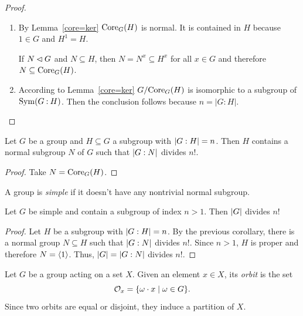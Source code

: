 \begin{proof}${}$

\begin{enumerate}[\upshape a)]
    \item By {\upshape Lemma~\ref{core=ker}} ${\rm Core}_G(H)$ is normal. It is contained in $H$ because $1\in G$ and $H^1=H$.
    
    If $N\lhd G$ and $N\subseteq H$, then $N=N^x\subseteq H^x$ for all $x\in G$ and therefore $N\subseteq{\rm Core}_G(H)$.

    \item According to {\upshape Lemma~\ref{core=ker}} $G/{\rm Core}_G(H)$ is isomorphic to a subgroup of\/ ${\rm Sym}(G\mathbin:H)$. Then the conclusion follows because $n=|G:H|$.
\end{enumerate}
\end{proof}

\begin{cor}\label{n!-theorem}{\upshape[$n!$ theorem]}
    Let $G$ be a group and\/ $H \subseteq G$ a subgroup with $\left\vert{G:H}\right\vert = n$. Then $H$ contains a normal subgroup\/ $N$ of\/ $G$ such that $\left\vert{G:N}\right\vert$ divides $n!$.
\end{cor}

\begin{proof} Take $N={\rm Core}_G(H)$.  \end{proof}

\begin{defn}
    A group is \textsl{simple} if it doesn't have any nontrivial normal subgroup.  {}
\end{defn}

\begin{cor}\label{order-divide-n!}
    Let $G$ be simple and contain a subgroup of index $n > 1$. Then $\left\vert{G}\right\vert$ divides $n!$
\end{cor}

\begin{proof} Let $H$ be a subgroup with $\left\vert{G:H}\right\vert=n$. By the previous corollary, there is a normal group $N\subseteq H$ such that $\left\vert{G:N}\right\vert$ divides $n!$. Since $n>1$, $H$ is proper and therefore $N=\langle1\rangle$. Thus, $\left\vert{G}\right\vert=\left\vert{G:N}\right\vert$ divides $n!$.
\end{proof}

\begin{defn}
    Let\/ $G$ be a group acting on a set $X$. Given an element $x\in X$, its \textsl{orbit} is the set
    $$
        {\cal O}_x = \{\omega\cdot x\mid \omega\in G\}. 
    $$
    Since two orbits are equal or disjoint, they induce a partition of\/ $X$.
\end{defn}

